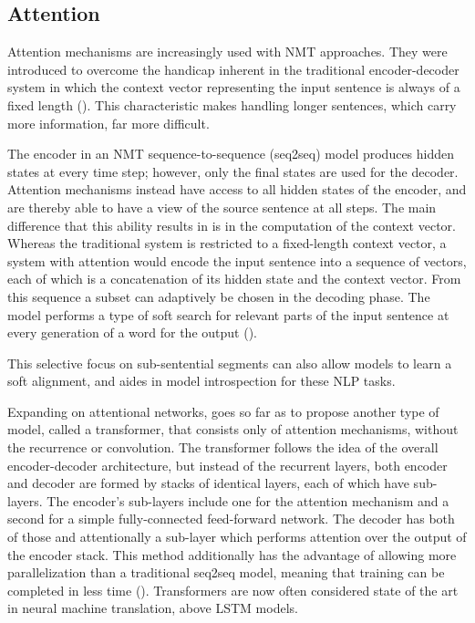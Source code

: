 \subsection{Attention}

Attention mechanisms are increasingly used with NMT approaches. They were introduced to overcome the handicap inherent in the traditional encoder-decoder system in which the context vector representing the input sentence is always of a fixed length (\cite{bahdanau2015attention}). This characteristic makes handling longer sentences, which carry more information, far more difficult.

The encoder in an NMT sequence-to-sequence (seq2seq) model produces hidden states at every time step; however, only the final states are used for the decoder. Attention mechanisms instead have access to all hidden states of the encoder, and are thereby able to have a view of the source sentence at all steps. The main difference that this ability results in is in the computation of the context vector. Whereas the traditional system is restricted to a fixed-length context vector, a system with attention would encode the input sentence into a sequence of vectors, each of which is a concatenation of its hidden state and the context vector. From this sequence a subset can adaptively be chosen in the decoding phase. The model performs a type of soft search for relevant parts of the input sentence at every generation of a word for the output (\cite{bahdanau2015attention}).

This selective focus on sub-sentential segments can also allow models to learn a soft alignment, and aides in model introspection for these NLP tasks.

Expanding on attentional networks, \cite{vaswani2018attention} goes so far as to propose another type of model, called a transformer, that consists only of attention mechanisms, without the recurrence or convolution. The transformer follows the idea of the overall encoder-decoder architecture, but instead of the recurrent layers, both encoder and decoder are formed by stacks of identical layers, each of which have sub-layers. The encoder's sub-layers include one for the attention mechanism and a second for a simple fully-connected feed-forward network. The decoder has both of those and attentionally a sub-layer which performs attention over the output of the encoder stack. This method additionally has the advantage of allowing more parallelization than a traditional seq2seq model, meaning that training can be completed in less time (\cite{vaswani2018attention}). Transformers are now often considered state of the art in neural machine translation, above LSTM models.

